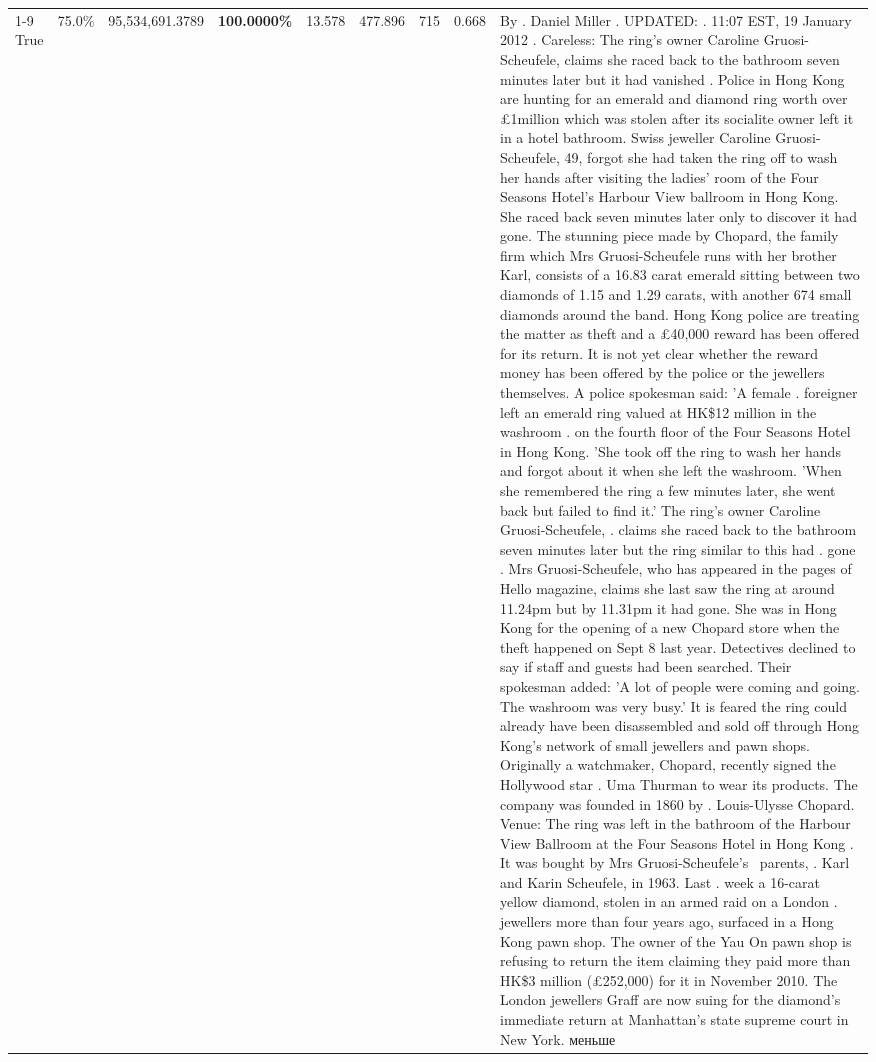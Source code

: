 \begin{table}[H]
\begin{tabular}{lllrlllll}
\cline{1-9}
True & 75.0\% & 95,534,691.3789 & \bfseries \color{red} 100.0000\% & 13.578 & 477.896 & 715 & 0.668 & By . Daniel Miller . UPDATED: . 11:07 EST, 19 January 2012 . Careless: The ring's owner Caroline Gruosi-Scheufele, claims she raced back to the bathroom seven minutes later but it had vanished . Police in Hong Kong are hunting for an emerald and diamond ring worth over £1million which was stolen after its socialite owner left it in a hotel bathroom. Swiss jeweller Caroline Gruosi-Scheufele, 49, forgot she had taken the ring off to wash her hands after visiting the ladies' room of the Four Seasons Hotel's Harbour View ballroom in Hong Kong. She raced back seven minutes later only to discover it had gone. The stunning piece made by Chopard, the family firm which Mrs Gruosi-Scheufele runs with her brother Karl, consists of a 16.83 carat emerald sitting between two diamonds of 1.15 and 1.29 carats, with another 674 small diamonds around the band. Hong Kong police are treating the matter as theft and a £40,000 reward has been offered for its return. It is not yet clear whether the reward money has been offered by the police or the jewellers themselves. A police spokesman said: 'A female . foreigner left an emerald ring valued at HK\$12 million in the washroom . on the fourth floor of the Four Seasons Hotel in Hong Kong. 'She took off the ring to wash her hands and forgot about it when she left the washroom. 'When she remembered the ring a few minutes later, she went back but failed to find it.' The ring's owner Caroline Gruosi-Scheufele, . claims she raced back to the bathroom seven minutes later but the ring similar to this had . gone . Mrs Gruosi-Scheufele, who has appeared in the pages of Hello magazine, claims she last saw the ring at around 11.24pm but by 11.31pm it had gone. She was in Hong Kong for the opening of a new Chopard store when the theft happened on Sept 8 last year. Detectives declined to say if staff and guests had been searched. Their spokesman added: 'A lot of people were coming and going. The washroom was very busy.' It is feared the ring could already have been disassembled and sold off through Hong Kong's network of small jewellers and pawn shops. Originally a watchmaker, Chopard, recently signed the Hollywood star . Uma Thurman to wear its products. The company was founded in 1860 by . Louis-Ulysse Chopard. Venue: The ring was left in the bathroom of the Harbour View Ballroom at the Four Seasons Hotel in Hong Kong . It was bought by Mrs Gruosi-Scheufele's  parents, . Karl and Karin Scheufele, in 1963. Last . week a 16-carat yellow diamond, stolen in an armed raid on a London . jewellers more than four years ago, surfaced in a Hong Kong pawn shop. The owner of the Yau On pawn shop is refusing to return the item claiming they paid more than HK\$3 million (£252,000) for it in November 2010. The London jewellers Graff are now suing for the diamond’s immediate return at Manhattan’s state supreme court in New York. меньше \\

\end{tabular}
\end{table}
